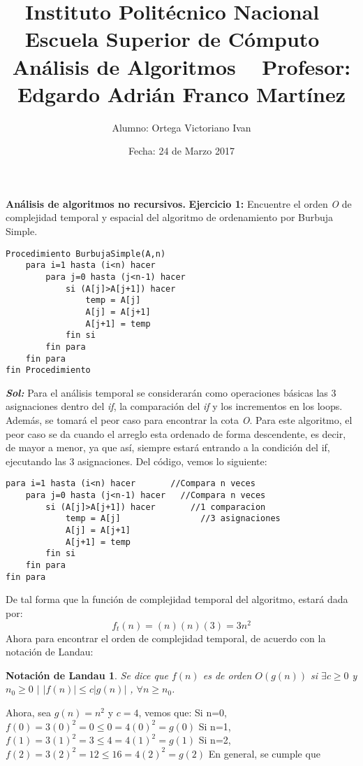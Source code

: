 \documentclass[12pt, letterpaper, twoside]{article}
\title{\textbf{Instituto Politécnico Nacional
			\vspace{10mm}	 \ \newline	
			Escuela Superior de Cómputo}
			\vspace{10mm}	 \ \newline	
			Análisis de Algoritmos
			\vspace{10mm}	 \ \newline	
			Profesor: Edgardo Adrián Franco Martínez}
\author{Alumno: Ortega Victoriano Ivan}
\date{Fecha: 24 de Marzo 2017}
\begin{document}
\begin{titlepage}
\maketitle
\end{titlepage}
\justify
\textbf{Análisis de algoritmos no recursivos.}\newline
\textbf{Ejercicio 1:} Encuentre el orden \textit{O} de complejidad temporal y espacial del algoritmo de ordenamiento por Burbuja Simple. 
\begin{lstlisting}
Procedimiento BurbujaSimple(A,n)
	para i=1 hasta (i<n) hacer
		para j=0 hasta (j<n-1) hacer
			si (A[j]>A[j+1]) hacer
				temp = A[j]
				A[j] = A[j+1]
				A[j+1] = temp
			fin si
		fin para
	fin para
fin Procedimiento
\end{lstlisting}
\justify
\textbf{\textit{Sol:}}
Para el análisis temporal se considerarán como operaciones básicas las 3 asignaciones dentro del \textit{if}, la comparación del \textit{if} y los incrementos en los loops. Además, se tomará el peor caso para encontrar la cota \textit{O}.
\newline
Para este algoritmo, el peor caso se da cuando el arreglo esta ordenado de forma descendente, es decir, de mayor a menor, ya que así, siempre estará entrando a la condición del if, ejecutando las 3 asignaciones. Del código, vemos lo siguiente:
\begin{lstlisting}
para i=1 hasta (i<n) hacer       //Compara n veces
	para j=0 hasta (j<n-1) hacer   //Compara n veces
		si (A[j]>A[j+1]) hacer       //1 comparacion
			temp = A[j]                //3 asignaciones
			A[j] = A[j+1]
			A[j+1] = temp
		fin si
	fin para
fin para
\end{lstlisting}
De tal forma que la función de complejidad temporal del algoritmo, estará dada por:
\[f_{t}(n) = (n)(n)(3) = 3n^{2}\]
Ahora para encontrar el orden de complejidad temporal, de acuerdo con la notación de Landau:
\newtheorem*{teo}{Notación de Landau}
\begin{teo}
Se dice que $f(n)$ es de orden $O(g(n))$ si
\center
$\exists c \geq 0$ y $n_{0} \geq 0$ $\mid$ $|f(n)|\leq c|g(n)|$ , $\forall n\geq n_{0}$.
\end{teo}
\justify
Ahora, sea $g(n)=n^{2}$ y $c=4$, vemos que:\newline
Si n=0,
\center$f(0)=3(0)^{2}=0\leq 0 = 4(0)^{2}=g(0)$
\justify
Si n=1,
\center$f(1)=3(1)^{2}=3\leq 4 = 4(1)^{2}=g(1)$
\justify
Si n=2,
\center$f(2)=3(2)^{2}=12\leq 16 = 4(2)^{2}=g(2)$
\justify
En general, se cumple que
\end{document}
